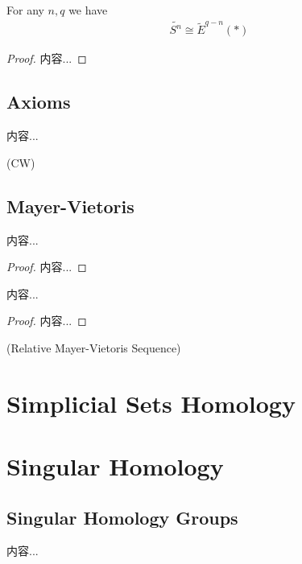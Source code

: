 \documentclass[Total.tex]{subfiles}
\begin{document}
			\begin{corollary}
				For any $n,q$ we have
				\begin{gather*}
					\tilde{S^n}\cong \tilde{E}^{q-n}(*)
				\end{gather*}
			\end{corollary}
			\begin{proof}
				内容...
			\end{proof}
			\subsection{Axioms}
			\begin{Def}
				内容...
			\end{Def}
			
			\begin{Def}
				(CW)
			\end{Def}
			\subsection{Mayer-Vietoris}
			
			\begin{proposition}
				内容...
			\end{proposition}
			\begin{proof}
				内容...
			\end{proof}
			
			\begin{lemma}
				内容...
			\end{lemma}
			\begin{proof}
				内容...
			\end{proof}
			
			\begin{theorem}
				(Relative Mayer-Vietoris Sequence)
			\end{theorem}
		\section{Simplicial Sets Homology}
		\section{Singular Homology}	\subsection{Singular Homology Groups}
			\begin{Def}
				内容...
			\end{Def}
			
\end{document}
